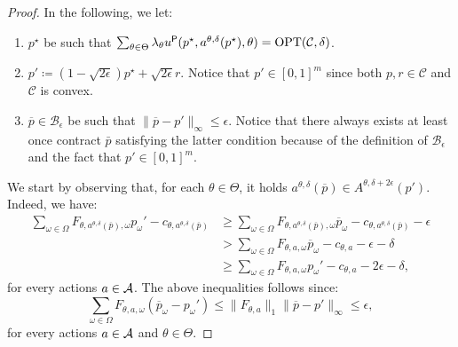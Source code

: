 %
%
%
%
\NoRegretThm*
\begin{proof}
	In the following, we let:
	\begin{enumerate}
		\item $p^\star$ be such that $\sum_{\theta \in \Theta}\lambda_\theta u^{\mathsf{P}}(p^\star,a^{\theta,\delta}(p^\star),\theta)=\textnormal{OPT}(\mathcal{C},\delta)$. 
		\item $p' \coloneqq (1-\sqrt{2\epsilon})p^\star + \sqrt{2\epsilon} r$. Notice that $p' \in [0,1]^m $ since both $p,r \in \mathcal{C}$ and $\mathcal{C}$ is convex.
		\item $\overline p \in \mathcal{B}_\epsilon$ be such that $\| \overline p-p'\|_{\infty} \le \epsilon$. Notice that there always exists at least once contract $\bar p$ satisfying the latter condition because of the definition of $\mathcal{B}_\epsilon$ and the fact that $p' \in [0,1]^m $.
		
	\end{enumerate}
	We start by observing that, for each $\theta \in \Theta$, it holds $a^{\theta,\delta}(\overline{p}) \in {A}^{\theta, \delta + 2 \epsilon}(p')$. Indeed, we have:
	\begin{align*}	
		\sum_{\omega \in \Omega} F_{\theta, a^{\theta,\delta}(\overline{p}),\omega} p_\omega' - c_{ \theta,a^{\theta,\delta}(\overline{p})}
		& \ge \sum_{\omega \in \Omega} F_{ \theta,a^{\theta,\delta}(\overline{p}),\omega} \overline{p}_\omega - c_{ \theta,a^{\theta,\delta}(\overline{p})} - \epsilon \\
		& > \sum_{\omega \in \Omega} F_{ \theta,a,\omega} \overline{p}_\omega - c_{ \theta,a} - \epsilon - \delta \\
		& \ge \sum_{\omega \in \Omega} F_{ \theta,a,\omega} p_\omega' - c_{\theta, a} - 2\epsilon - \delta,
	\end{align*}
	for every actions $a \in \mathcal{A}$. The above inequalities follows since:
	$$\sum_{\omega \in \Omega}F_{\theta,a, \omega} (\overline{p}_\omega-p_\omega') \le \|F_{\theta,a}\|_1 \|\overline{p}-p'\|_{\infty} \le \epsilon,$$ for every actions $a \in \mathcal{A}$ and $\theta \in \Theta$.
	

\end{proof}
